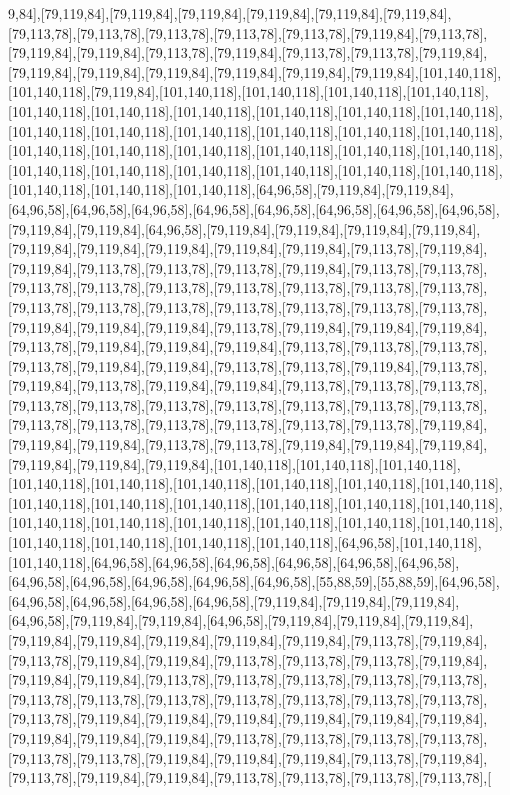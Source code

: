 9,84],[79,119,84],[79,119,84],[79,119,84],[79,119,84],[79,119,84],[79,119,84],[79,113,78],[79,113,78],[79,113,78],[79,113,78],[79,113,78],[79,119,84],[79,113,78],[79,119,84],[79,119,84],[79,113,78],[79,119,84],[79,113,78],[79,113,78],[79,119,84],[79,119,84],[79,119,84],[79,119,84],[79,119,84],[79,119,84],[79,119,84],[101,140,118],[101,140,118],[79,119,84],[101,140,118],[101,140,118],[101,140,118],[101,140,118],[101,140,118],[101,140,118],[101,140,118],[101,140,118],[101,140,118],[101,140,118],[101,140,118],[101,140,118],[101,140,118],[101,140,118],[101,140,118],[101,140,118],[101,140,118],[101,140,118],[101,140,118],[101,140,118],[101,140,118],[101,140,118],[101,140,118],[101,140,118],[101,140,118],[101,140,118],[101,140,118],[101,140,118],[101,140,118],[101,140,118],[101,140,118],[64,96,58],[79,119,84],[79,119,84],[64,96,58],[64,96,58],[64,96,58],[64,96,58],[64,96,58],[64,96,58],[64,96,58],[64,96,58],[79,119,84],[79,119,84],[64,96,58],[79,119,84],[79,119,84],[79,119,84],[79,119,84],[79,119,84],[79,119,84],[79,119,84],[79,119,84],[79,119,84],[79,113,78],[79,119,84],[79,119,84],[79,113,78],[79,113,78],[79,113,78],[79,119,84],[79,113,78],[79,113,78],[79,113,78],[79,113,78],[79,113,78],[79,113,78],[79,113,78],[79,113,78],[79,113,78],[79,113,78],[79,113,78],[79,113,78],[79,113,78],[79,113,78],[79,113,78],[79,113,78],[79,119,84],[79,119,84],[79,119,84],[79,113,78],[79,119,84],[79,119,84],[79,119,84],[79,113,78],[79,119,84],[79,119,84],[79,119,84],[79,113,78],[79,113,78],[79,113,78],[79,113,78],[79,119,84],[79,119,84],[79,113,78],[79,113,78],[79,119,84],[79,113,78],[79,119,84],[79,113,78],[79,119,84],[79,119,84],[79,113,78],[79,113,78],[79,113,78],[79,113,78],[79,113,78],[79,113,78],[79,113,78],[79,113,78],[79,113,78],[79,113,78],[79,113,78],[79,113,78],[79,113,78],[79,113,78],[79,113,78],[79,113,78],[79,119,84],[79,119,84],[79,119,84],[79,113,78],[79,113,78],[79,119,84],[79,119,84],[79,119,84],[79,119,84],[79,119,84],[79,119,84],[101,140,118],[101,140,118],[101,140,118],[101,140,118],[101,140,118],[101,140,118],[101,140,118],[101,140,118],[101,140,118],[101,140,118],[101,140,118],[101,140,118],[101,140,118],[101,140,118],[101,140,118],[101,140,118],[101,140,118],[101,140,118],[101,140,118],[101,140,118],[101,140,118],[101,140,118],[101,140,118],[101,140,118],[101,140,118],[64,96,58],[101,140,118],[101,140,118],[64,96,58],[64,96,58],[64,96,58],[64,96,58],[64,96,58],[64,96,58],[64,96,58],[64,96,58],[64,96,58],[64,96,58],[64,96,58],[55,88,59],[55,88,59],[64,96,58],[64,96,58],[64,96,58],[64,96,58],[64,96,58],[79,119,84],[79,119,84],[79,119,84],[64,96,58],[79,119,84],[79,119,84],[64,96,58],[79,119,84],[79,119,84],[79,119,84],[79,119,84],[79,119,84],[79,119,84],[79,119,84],[79,119,84],[79,113,78],[79,119,84],[79,113,78],[79,119,84],[79,119,84],[79,113,78],[79,113,78],[79,113,78],[79,119,84],[79,119,84],[79,119,84],[79,113,78],[79,113,78],[79,113,78],[79,113,78],[79,113,78],[79,113,78],[79,113,78],[79,113,78],[79,113,78],[79,113,78],[79,113,78],[79,113,78],[79,113,78],[79,119,84],[79,119,84],[79,119,84],[79,119,84],[79,119,84],[79,119,84],[79,119,84],[79,119,84],[79,119,84],[79,113,78],[79,113,78],[79,113,78],[79,113,78],[79,113,78],[79,113,78],[79,119,84],[79,119,84],[79,119,84],[79,113,78],[79,119,84],[79,113,78],[79,119,84],[79,119,84],[79,113,78],[79,113,78],[79,113,78],[79,113,78],[